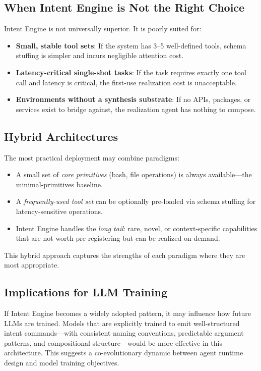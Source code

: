 \documentclass[11pt]{article}
\begin{document}
\subsection{When Intent Engine is Not the Right Choice}

Intent Engine is not universally superior. It is poorly suited for:
\begin{itemize}[leftmargin=*]
  \item \textbf{Small, stable tool sets}: If the system has 3--5 well-defined tools, schema stuffing is simpler and incurs negligible attention cost.
  \item \textbf{Latency-critical single-shot tasks}: If the task requires exactly one tool call and latency is critical, the first-use realization cost is unacceptable.
  \item \textbf{Environments without a synthesis substrate}: If no APIs, packages, or services exist to bridge against, the realization agent has nothing to compose.
\end{itemize}

\subsection{Hybrid Architectures}

The most practical deployment may combine paradigms:
\begin{itemize}[leftmargin=*]
  \item A small set of \emph{core primitives} (bash, file operations) is always available---the minimal-primitives baseline.
  \item A \emph{frequently-used tool set} can be optionally pre-loaded via schema stuffing for latency-sensitive operations.
  \item Intent Engine handles the \emph{long tail}: rare, novel, or context-specific capabilities that are not worth pre-registering but can be realized on demand.
\end{itemize}

This hybrid approach captures the strengths of each paradigm where they are most appropriate.

\subsection{Implications for LLM Training}

If Intent Engine becomes a widely adopted pattern, it may influence how future LLMs are trained.
Models that are explicitly trained to emit well-structured intent commands---with consistent naming conventions, predictable argument patterns, and compositional structure---would be more effective in this architecture.
This suggests a co-evolutionary dynamic between agent runtime design and model training objectives.
\end{document}
